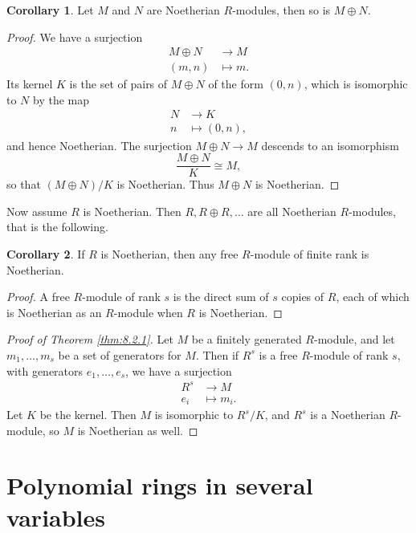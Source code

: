 \documentclass{article}
\newcommand{\rb}[1]{\left( #1 \right)}
\theoremstyle{definition}\newtheorem{definition}{Definition}[subsection]
\theoremstyle{definition}\newtheorem{remark}[definition]{Remark}
\theoremstyle{definition}\newtheorem*{example}{Example}
\theoremstyle{definition}\newtheorem*{note}{Note}
\newtheorem{corollary}[definition]{Corollary}
\begin{document}
\begin{corollary}
Let $ M $ and $ N $ are Noetherian $ R $-modules, then so is $ M \oplus N $.
\end{corollary}

\begin{proof}
We have a surjection
\begin{align*}
M \oplus N & \to M \\
\rb{m, n} & \mapsto m.
\end{align*}
Its kernel $ K $ is the set of pairs of $ M \oplus N $ of the form $ \rb{0, n} $, which is isomorphic to $ N $ by the map
\begin{align*}
N & \to K \\
n & \mapsto \rb{0, n},
\end{align*}
and hence Noetherian. The surjection $ M \oplus N \to M $ descends to an isomorphism
$$ \dfrac{M \oplus N}{K} \cong M, $$
so that $ \rb{M \oplus N} / K $ is Noetherian. Thus $ M \oplus N $ is Noetherian.
\end{proof}

Now assume $ R $ is Noetherian. Then $ R, R \oplus R, \dots $ are all Noetherian $ R $-modules, that is the following.

\begin{corollary}
If $ R $ is Noetherian, then any free $ R $-module of finite rank is Noetherian.
\end{corollary}

\begin{proof}
A free $ R $-module of rank $ s $ is the direct sum of $ s $ copies of $ R $, each of which is Noetherian as an $ R $-module when $ R $ is Noetherian.
\end{proof}

\begin{proof}[Proof of Theorem \ref{thm:8.2.1}]
Let $ M $ be a finitely generated $ R $-module, and let $ m_1, \dots, m_s $ be a set of generators for $ M $. Then if $ R^s $ is a free $ R $-module of rank $ s $, with generators $ e_1, \dots, e_s $, we have a surjection
\begin{align*}
R^s & \to M \\
e_i & \mapsto m_i.
\end{align*}
Let $ K $ be the kernel. Then $ M $ is isomorphic to $ R^s / K $, and $ R^s $ is a Noetherian $ R $-module, so $ M $ is Noetherian as well.
\end{proof}

\pagebreak

\section{Polynomial rings in several variables}
\end{document}
